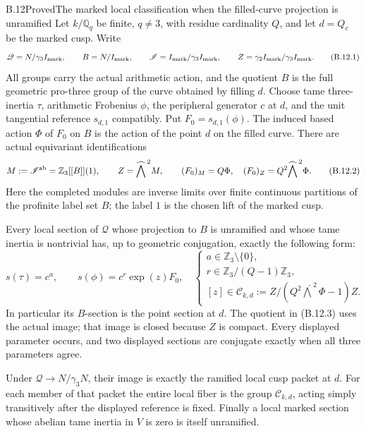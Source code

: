 \begin{statement}{B.12}{Proved}{The marked local classification when the filled-curve projection is unramified}
Let $k/\mathbb Q_q$ be finite, $q\ne3$, with residue cardinality
$Q$, and let $d=Q_c$ be the marked cusp. Write
\[
 \mathscr Q=N/\gamma_3I_{\rm mark},\qquad
 B=N/I_{\rm mark},\qquad
 \mathscr I=I_{\rm mark}/\gamma_3I_{\rm mark},\qquad
 Z=\gamma_2I_{\rm mark}/\gamma_3I_{\rm mark}.
 \tag{B.12.1}
\]
All groups carry the actual arithmetic action, and the
quotient $B$ is the full geometric pro-three group of the
curve obtained by filling $d$.
Choose tame three-inertia $\tau$, arithmetic Frobenius
$\phi$, the peripheral generator $c$ at $d$, and the
unit tangential reference $s_{d,1}$ compatibly.
Put $F_0=s_{d,1}(\phi)$.
The induced based action $\Phi$ of $F_0$ on $B$ is
the action of the point $d$ on the filled curve.
There are actual equivariant identifications
\[
 M:=\mathscr I^{\rm ab}
     =\mathbb Z_3[[B]](1),\qquad
 Z=\widehat{\bigwedge}^{\,2}M,\qquad
 (F_0)_M=Q\Phi,\quad (F_0)_Z=Q^2\widehat{\bigwedge}^{\,2}\Phi.
 \tag{B.12.2}
\]
Here the completed modules are inverse limits over finite
continuous partitions of the profinite label set $B$;
the label $1$ is the chosen lift of the marked cusp.

Every local section of $\mathscr Q$ whose projection to $B$
is unramified and whose tame inertia is nontrivial has,
up to geometric conjugation, exactly the following form:
\[
 s(\tau)=c^a,\qquad s(\phi)=c^r\exp(z)F_0,
 \quad
 \begin{cases}
 a\in\mathbb Z_3\setminus\{0\},\\
 r\in\mathbb Z_3/(Q-1)\mathbb Z_3,\\
 [z]\in\mathcal C_{k,d}:=
 Z/(Q^2\widehat{\bigwedge}^{\,2}\Phi-1)Z .
 \end{cases}                                                \tag{B.12.3}
\]
In particular its $B$-section is the point section at $d$.
The quotient in (B.12.3) uses the actual image; that image
is closed because $Z$ is compact.
Every displayed parameter occurs, and two displayed
sections are conjugate exactly when all three parameters
agree.

Under $\mathscr Q\to N/\gamma_3N$, their image is exactly
the ramified local cusp packet at $d$. For each member of
that packet the entire local fiber is the group
$\mathcal C_{k,d}$, acting simply transitively after the
displayed reference is fixed.
Finally a local marked section whose abelian tame inertia
in $V$ is zero is itself unramified.
\end{statement}
